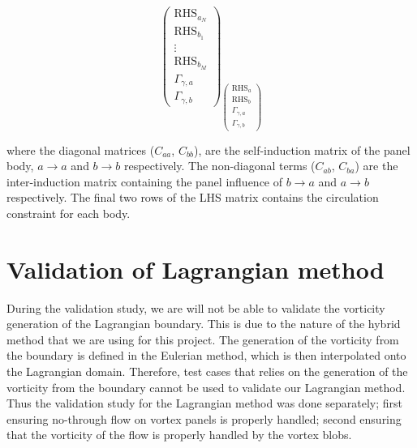 \begin{equation}
{\begin{pmatrix}
		\mathrm{RHS}_{a_N}\\
		\mathrm{RHS}_{b_1}\\
		\vdots\\
		\mathrm{RHS}_{b_M}\\
		\Gamma_{\gamma,a}\\	
	\Gamma_{\gamma,b}
	\end{pmatrix}}_{ 
			\begin{pmatrix}
				\mathrm{RHS}_{a}\\
				\mathrm{RHS}_{b}\\
				\Gamma_{\gamma,a}\\	
				\Gamma_{\gamma,b}
			\end{pmatrix}}
	\end{equation}

where the diagonal matrices ($C_{aa}$, $C_{bb}$), are the self-induction matrix of the panel body, $a \rightarrow a$ and $b \rightarrow b$ respectively. The non-diagonal terms ($C_{ab}$, $C_{ba}$) are the inter-induction matrix containing the panel influence of $b\rightarrow a$ and $a\rightarrow b$ respectively. The final two rows of the LHS matrix contains the circulation constraint for each body.

%
\section{Validation of Lagrangian method}
During the validation study, we are will not be able to validate the vorticity generation of the Lagrangian boundary. 
This is due to the nature of the hybrid method that we are using for this project. The generation of the vorticity from the boundary is defined in the Eulerian method, which is then interpolated onto the Lagrangian domain. Therefore, test cases that relies on the generation of the vorticity from the boundary cannot be used to validate our Lagrangian method.
Thus the validation study for the Lagrangian method was done separately; first ensuring no-through flow on vortex panels is properly handled; second ensuring that the vorticity of the flow is properly handled by the vortex blobs.

